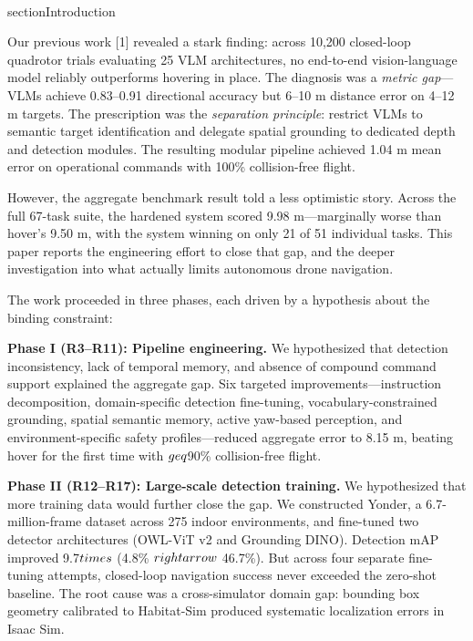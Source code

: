 \documentclass[conference]{IEEEtran}
\begin{document}
\\section{Introduction}\label{i.-introduction}

Our previous work [1] revealed a stark finding: across 10,200
closed-loop quadrotor trials evaluating 25 VLM architectures, no
end-to-end vision-language model reliably outperforms hovering in place.
The diagnosis was a \emph{metric gap}---VLMs achieve 0.83--0.91
directional accuracy but 6--10 m distance error on 4--12 m targets. The
prescription was the \emph{separation principle}: restrict VLMs to
semantic target identification and delegate spatial grounding to
dedicated depth and detection modules. The resulting modular pipeline
achieved 1.04 m mean error on operational commands with 100\%
collision-free flight.

However, the aggregate benchmark result told a less optimistic story.
Across the full 67-task suite, the hardened system scored 9.98
m---marginally worse than hover's 9.50 m, with the system winning on
only 21 of 51 individual tasks. This paper reports the engineering
effort to close that gap, and the deeper investigation into what
actually limits autonomous drone navigation.

The work proceeded in three phases, each driven by a hypothesis about
the binding constraint:

\textbf{Phase I (R3--R11): Pipeline engineering.} We hypothesized that
detection inconsistency, lack of temporal memory, and absence of
compound command support explained the aggregate gap. Six targeted
improvements---instruction decomposition, domain-specific detection
fine-tuning, vocabulary-constrained grounding, spatial semantic memory,
active yaw-based perception, and environment-specific safety
profiles---reduced aggregate error to 8.15 m, beating hover for the
first time with $\\geq$90\% collision-free flight.

\textbf{Phase II (R12--R17): Large-scale detection training.} We
hypothesized that more training data would further close the gap. We
constructed Yonder, a 6.7-million-frame dataset across 275 indoor
environments, and fine-tuned two detector architectures (OWL-ViT v2 and
Grounding DINO). Detection mAP improved 9.7$\\times$ (4.8\% $\\rightarrow$ 46.7\%). But
across four separate fine-tuning attempts, closed-loop navigation
success never exceeded the zero-shot baseline. The root cause was a
cross-simulator domain gap: bounding box geometry calibrated to
Habitat-Sim produced systematic localization errors in Isaac Sim.
\end{document}
